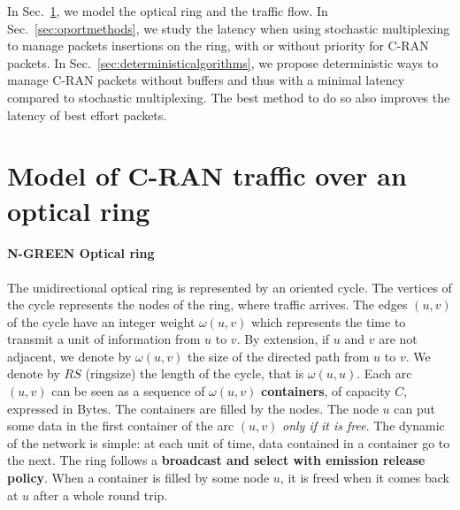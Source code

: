\documentclass[]{algotel}
\newcommand{\todo}[1]{{\color{red} TODO: {#1}}}
\begin{document}
In Sec.~\ref{sec:model}, we model the optical ring and the traffic flow. In Sec.~\ref{sec:oportmethods}, we study the latency when using stochastic multiplexing to manage packets insertions on the ring, with or without priority for C-RAN packets. In Sec.~\ref{sec:deterministicalgorithms}, we propose deterministic ways to manage C-RAN packets without buffers and thus with a minimal latency compared to stochastic multiplexing. The best method to do so also improves the latency of best effort packets.

\section{Model of C-RAN traffic over an optical ring}
\label{sec:model}
% 
% 
          
  \paragraph{N-GREEN Optical ring}
   
  The unidirectional optical ring is represented by an oriented cycle. The vertices of the cycle represents the nodes of the ring, where traffic arrives. The edges $(u,v)$ of the cycle have an integer weight $\omega(u,v)$ which represents the time to transmit a unit of information from $u$ to $v$. By extension, if $u$ and $v$ are not adjacent, we denote by $\omega(u,v)$ the size of the directed path from $u$ to $v$.  We denote by $RS$ (ringsize) the length of the cycle, that is $\omega(u,u)$.  Each arc $(u,v)$ can be seen as a sequence of $\omega(u,v)$ {\bf containers}, of capacity $C$, expressed in Bytes.  The containers are filled by the nodes. The node $u$ can put some data in the first container of the arc $(u,v)$ \emph{only if it is free}. 
  The dynamic of the network is simple: at each unit of time, data contained in a container go to the next.
   The ring follows a {\bf broadcast and select with emission release policy}. When a container is filled by some node $u$,
   it is freed when it comes back at $u$ after a whole round trip.
   
\end{document}
